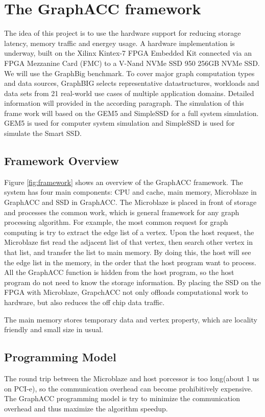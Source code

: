 \section{The GraphACC framework}
The idea of this project is to use the hardware support for reducing storage latency, memory traffic and energey usage. A hardware implementation is underway, built on the Xilinx Kintex-7 FPGA Embedded Kit connected via an FPGA Mezzanine Card (FMC) to a V-Nand NVMe SSD 950 256GB NVMe SSD. We will use the GraphBig benchmark\cite{nai2015graphbig}. To cover major graph computation types and data sources, GraphBIG selects representative datastructures, workloads and data sets from 21 real-world use cases of multiple application domains.  Detailed information will provided in the according paragraph. The simulation of this frame work will based on the GEM5 and SimpleSSD for a full system simulation. GEM5 is used for computer system simulation and SimpleSSD is used for simulate the Smart SSD.
\subsection{Framework Overview}
Figure \ref{fig:framework} shows an overview of the GraphACC framework. The system has four main components: CPU and cache, main memory, Microblaze in GraphACC and SSD in GraphACC. 
The Microblaze is placed in front of storage and processes the common work, which is general framework for any graph processing algorithm. For example, the most common request for graph computing is try to extract the edge list of a vertex. Upon the host request, the Microblaze fist read the adjacent list of that vertex, then search other vertex in that list, and transfer the list to main memory. By doing this, the host will see the edge list in the memory, in the order that the host program want to process. All the GraphACC function is hidden from the host program, so the host program do not need to know the storage information. By placing the SSD on the FPGA with Microblaze, GrapchACC not only offloads computational work to hardware, but also reduces the off chip data traffic. 



The main memory stores temporary data and vertex property, which are locality friendly and small size in usual. 

\subsection{Programming Model}
The round trip between the Microblaze and host porcessor is too long(about 1 us on PCI-e), so the communication overhead can become prohibitively expensive. The GraphACC programming model is try to minimize the communication overhead and thus maximize the algorithm speedup. 



